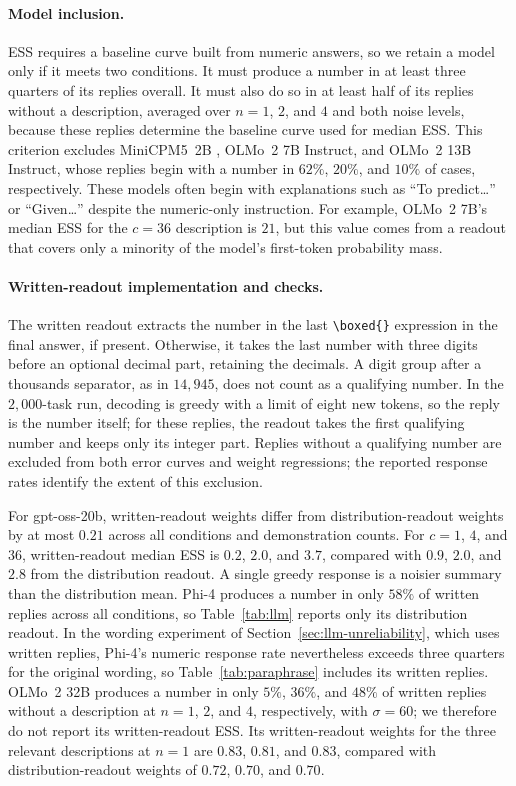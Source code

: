 \paragraph{Model inclusion.}
ESS requires a baseline curve built from numeric answers, so we retain a model only if it meets two conditions. It must produce a number in at least three quarters of its replies overall. It must also do so in at least half of its replies without a description, averaged over $n=1$, $2$, and $4$ and both noise levels, because these replies determine the baseline curve used for median ESS. This criterion excludes MiniCPM5~2B \citep{minicpm5}, OLMo~2 7B Instruct, and OLMo~2 13B Instruct, whose replies begin with a number in $62\%$, $20\%$, and $10\%$ of cases, respectively. These models often begin with explanations such as ``To predict\ldots'' or ``Given\ldots'' despite the numeric-only instruction. For example, OLMo~2 7B's median ESS for the $c = 36$ description is $21$, but this value comes from a readout that covers only a minority of the model's first-token probability mass.

\paragraph{Written-readout implementation and checks.}
The written readout extracts the number in the last \verb|\boxed{}| expression in the final answer, if present. Otherwise, it takes the last number with three digits before an optional decimal part, retaining the decimals. A digit group after a thousands separator, as in $14{,}945$, does not count as a qualifying number. In the $2{,}000$-task run, decoding is greedy with a limit of eight new tokens, so the reply is the number itself; for these replies, the readout takes the first qualifying number and keeps only its integer part. Replies without a qualifying number are excluded from both error curves and weight regressions; the reported response rates identify the extent of this exclusion.

For gpt-oss-20b, written-readout weights differ from distribution-readout weights by at most $0.21$ across all conditions and demonstration counts. For $c = 1$, $4$, and $36$, written-readout median ESS is $0.2$, $2.0$, and $3.7$, compared with $0.9$, $2.0$, and $2.8$ from the distribution readout. A single greedy response is a noisier summary than the distribution mean. Phi-4 produces a number in only $58\%$ of written replies across all conditions, so Table~\ref{tab:llm} reports only its distribution readout. In the wording experiment of Section~\ref{sec:llm-unreliability}, which uses written replies, Phi-4's numeric response rate nevertheless exceeds three quarters for the original wording, so Table~\ref{tab:paraphrase} includes its written replies. OLMo~2 32B produces a number in only $5\%$, $36\%$, and $48\%$ of written replies without a description at $n = 1$, $2$, and $4$, respectively, with $\sigma = 60$; we therefore do not report its written-readout ESS. Its written-readout weights for the three relevant descriptions at $n = 1$ are $0.83$, $0.81$, and $0.83$, compared with distribution-readout weights of $0.72$, $0.70$, and $0.70$.

